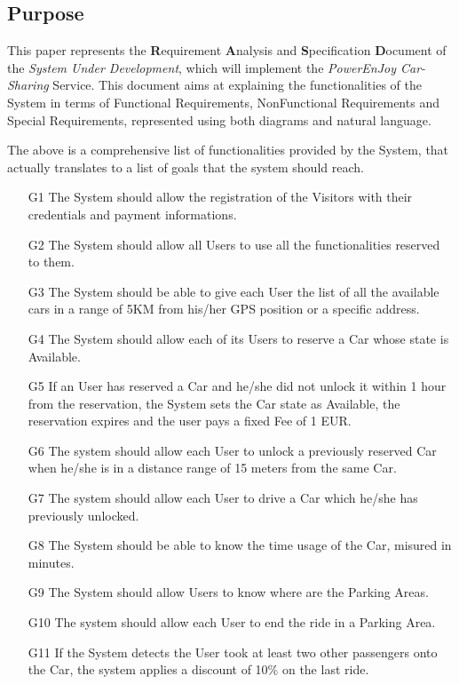 \subsection{Purpose}
This paper represents the \textbf{R}equirement \textbf{A}nalysis and \textbf{S}pecification \textbf{D}ocument of the \textit{System Under Development}, which will implement the \emph{PowerEnJoy Car-Sharing} Service. This document aims at explaining the functionalities of the System in terms of Functional Requirements, NonFunctional Requirements and Special Requirements, represented using both diagrams and natural language.

The above is a comprehensive list of functionalities provided by the System, that actually translates to a list of goals that the system should reach.

\begin{enumerate}
	\item[G1] The System should allow the registration of the Visitors with their credentials and payment informations.
	\item[G2] The System should allow all Users to use all the functionalities reserved to them.
	\item[G3] The System should be able to give each User the list of all the available cars in a range of 5KM from his/her GPS position or a specific address.
	\item[G4] The System should allow each of its Users to reserve a Car whose state is Available.
	\item[G5] If an User has reserved a Car and he/she did not unlock it within 1 hour from the reservation, the System sets the Car state as Available, the reservation expires and the user pays a fixed Fee of 1 EUR.  
	\item[G6] The system should allow each User to unlock a previously reserved Car when he/she is in a distance range of 15 meters from the same Car.
	\item[G7] The system should allow each User to drive a Car which he/she has previously unlocked.
	\item[G8] The System should be able to know the time usage of the Car, misured in minutes.
	\item[G9] The System should allow Users to know where are the Parking Areas.
	\item[G10] The system should allow each User to end the ride in a Parking Area.
	\item[G11] If the System detects the User took at least two other passengers onto the Car, the system applies a discount of 10\% on the last ride. 

\end{enumerate}
